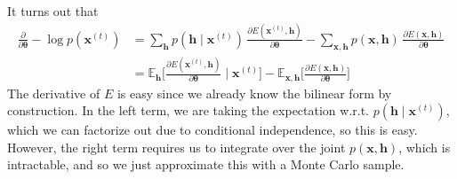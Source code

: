 \documentclass{article}
\begin{document}
      \begin{theorem}
        It turns out that
        \begin{align*} 
        \frac{\partial}{\partial \boldsymbol{\theta}} - \log p(\mathbf{x}^{(t)}) & = \sum_{\mathbf{h}}  p(\mathbf{h} \mid \mathbf{x}^{(t)}) \, \frac{ \partial E(\mathbf{x}^{(t)}, \mathbf{h})}{\partial \boldsymbol{\theta}} - \sum_{\mathbf{x}, \mathbf{h}} p(\mathbf{x}, \mathbf{h}) \, \frac{\partial E(\mathbf{x}, \mathbf{h})}{\partial \boldsymbol{\theta}} \\
                                                                                 & = \mathbb{E}_{\mathbf{h}} \bigg[ \frac{\partial E( \mathbf{x}^{(t)}, \mathbf{h})}{\partial \boldsymbol{\theta}} \; \bigg| \; \mathbf{x}^{(t)} \bigg] - \mathbb{E}_{\mathbf{x}, \mathbf{h}} \bigg[ \frac{\partial E(\mathbf{x}, \mathbf{h})}{\partial \boldsymbol{\theta}} \bigg]  
        \end{align*}
        The derivative of $E$ is easy since we already know the bilinear form by construction. In the left term, we are taking the expectation w.r.t. $p(\mathbf{h} \mid \mathbf{x}^{(t)})$, which we can factorize out due to conditional independence, so this is easy. However, the right term requires us to integrate over the joint $p(\mathbf{x}, \mathbf{h})$, which is intractable, and so we just approximate this with a Monte Carlo sample. 
      \end{theorem}
\end{document}
